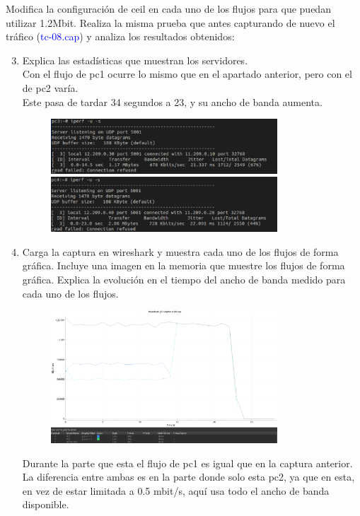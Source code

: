 \documentclass[12pt, a4paper]{report}
\begin{document}
Modifica la configuración de ceil en cada uno de los flujos para que puedan utilizar 1.2Mbit.
Realiza la misma prueba que antes capturando de nuevo el tráfico (\textcolor{blue}{tc-08.cap}) y analiza los resultados
obtenidos:
\begin{enumerate}
	\setcounter{enumi}{2}
	\item Explica las estadísticas que muestran los servidores.\\
	
	Con el flujo de pc1 ocurre lo mismo que en el apartado anterior, pero con el de pc2 varía.\\
	
	Este pasa de tardar 34 segundos a 23, y su ancho de banda aumenta.
	\begin{figure}[H]
		\centering
		\includegraphics[width=0.8\textwidth]{ej1.3.3_3_a}
		\includegraphics[width=0.8\textwidth]{ej1.3.3_3_b}
	\end{figure}
	\item Carga la captura en wireshark y muestra cada uno de los flujos de forma gráfica. Incluye una
	imagen en la memoria que muestre los flujos de forma gráfica. Explica la evolución en el tiempo
	del ancho de banda medido para cada uno de los flujos.
	\begin{figure}[H]
		\centering
		\includegraphics[width=0.8\textwidth]{ej1.3.3_4}
	\end{figure}
	Durante la parte que esta el flujo de pc1 es igual que en la captura anterior. La diferencia entre ambas es en la parte donde solo esta pc2, ya que en esta, en vez de estar limitada a 0.5 mbit/s, aquí usa todo el ancho de banda disponible.
\end{enumerate}
\end{document}
